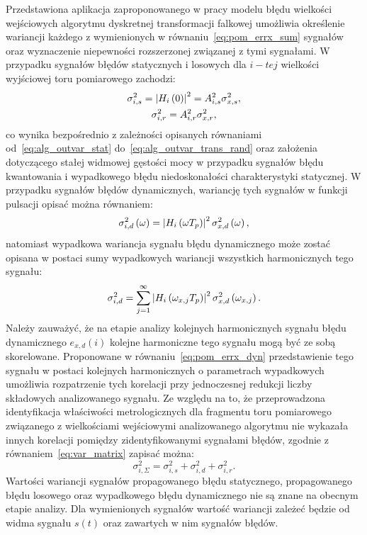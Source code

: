 Przedstawiona aplikacja zaproponowanego w pracy modelu błędu wielkości wejściowych algorytmu dyskretnej transformacji falkowej umożliwia określenie wariancji każdego z wymienionych w równaniu~\eqref{eq:pom_errx_sum} sygnałów oraz wyznaczenie niepewności rozszerzonej związanej z tymi sygnałami. W przypadku sygnałów błędów statycznych i losowych dla $i-tej$ wielkości wyjściowej toru pomiarowego zachodzi:
\begin{gather}
\sigma_{i,s}^{2} = \left| H_{i} \left(0\right) \right|^{2} = A_{i,s}^{2} \sigma_{x,s}^{2} \label{eq:pom_varout_stat}, \\
\sigma_{i,r}^{2} = A_{i,r}^{2} \sigma_{x,r}^{2} \label{eq:pom_varout_rand}, 
\end{gather}
co wynika bezpośrednio z zależności opisanych równaniami od~\eqref{eq:alg_outvar_stat} do~\eqref{eq:alg_outvar_trans_rand} oraz założenia dotyczącego stałej widmowej gęstości mocy w przypadku sygnałów błędu kwantowania i wypadkowego błędu niedoskonałości charakterystyki statycznej. W przypadku sygnałów błędów dynamicznych, wariancję tych sygnałów w funkcji pulsacji opisać można równaniem:
\begin{equation}
\sigma_{i,d}^{2} \left(\omega\right) = \left| H_{i} \left(\omega T_{p}\right) \right|^{2} \sigma_{x,d}^{2} \left(\omega\right) \label{eq:pom_varout_dyn},
\end{equation}
natomiast wypadkowa wariancja sygnału błędu dynamicznego może zostać opisana w postaci sumy wypadkowych wariancji wszystkich harmonicznych tego sygnału:
\begin{equation}
\sigma_{i,d}^{2} = \sum _{j=1} ^{\infty} \left| H_{i} \left(\omega_{x,j} T_{p}\right) \right|^{2} \sigma_{x,d}^{2} \left(\omega_{x,j}\right) \label{eq:pom_varout_dyn_sum}.
\end{equation}
Należy zauważyć, że na etapie analizy kolejnych harmonicznych sygnału błędu dynamicznego $e_{x,d}(i)$ kolejne harmoniczne tego sygnału mogą być ze sobą skorelowane. Proponowane w równaniu~\eqref{eq:pom_errx_dyn} przedstawienie tego sygnału w postaci kolejnych harmonicznych o parametrach wypadkowych umożliwia rozpatrzenie tych korelacji przy jednoczesnej redukcji liczby składowych analizowanego sygnału. Ze względu na to, że przeprowadzona identyfikacja właściwości metrologicznych dla fragmentu toru pomiarowego związanego z wielkościami wejściowymi analizowanego algorytmu nie wykazała innych korelacji pomiędzy zidentyfikowanymi sygnałami błędów, zgodnie z równaniem~\eqref{eq:var_matrix} zapisać można:
\begin{equation}
\sigma_{i,\Sigma}^{2} = \sigma_{i,s}^{2} + \sigma_{i,d}^{2} + \sigma_{i,r}^{2} \label{eq:pom_varout_sum}.
\end{equation}
Wartości wariancji sygnałów propagowanego błędu statycznego, propagowanego błędu losowego oraz wypadkowego błędu dynamicznego nie są znane na obecnym etapie analizy. Dla wymienionych sygnałów wartość wariancji zależeć będzie od widma sygnału $s(t)$ oraz zawartych w nim sygnałów błędów.

